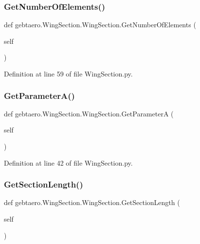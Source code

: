 \subsubsection{\texorpdfstring{Get\+Number\+Of\+Elements()}{GetNumberOfElements()}}
{\footnotesize\ttfamily def gebtaero.\+Wing\+Section.\+Wing\+Section.\+Get\+Number\+Of\+Elements (\begin{DoxyParamCaption}\item[{}]{self }\end{DoxyParamCaption})}



Definition at line 59 of file Wing\+Section.\+py.

\mbox{\label{classgebtaero_1_1_wing_section_1_1_wing_section_adc79518e2f548a3aaee672b9206a83f4}} 
\subsubsection{\texorpdfstring{Get\+Parameter\+A()}{GetParameterA()}}
{\footnotesize\ttfamily def gebtaero.\+Wing\+Section.\+Wing\+Section.\+Get\+ParameterA (\begin{DoxyParamCaption}\item[{}]{self }\end{DoxyParamCaption})}



Definition at line 42 of file Wing\+Section.\+py.

\mbox{\label{classgebtaero_1_1_wing_section_1_1_wing_section_a55b1955062f73aea55c508427f9491bf}} 
\subsubsection{\texorpdfstring{Get\+Section\+Length()}{GetSectionLength()}}
{\footnotesize\ttfamily def gebtaero.\+Wing\+Section.\+Wing\+Section.\+Get\+Section\+Length (\begin{DoxyParamCaption}\item[{}]{self }\end{DoxyParamCaption})}



